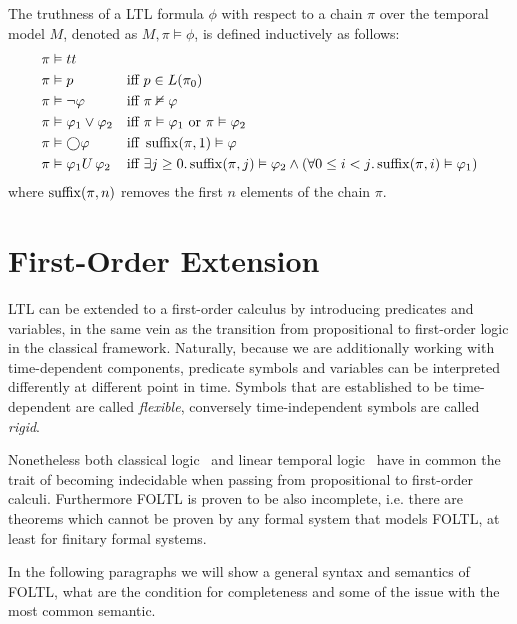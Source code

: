 \begin{definition}
  The truthness of a LTL formula $\phi$ with respect to a chain $\pi$ over the temporal model $M$, denoted as
  $M, \pi \vDash \phi$, is defined inductively as follows:
  \begin{align*}
    \pi &\vDash tt && \\
    \pi &\vDash p &&\text{iff } p \in L(\pi_0) \\
    \pi &\vDash \neg\varphi &&\text{iff } \pi \nvDash \varphi \\
    \pi &\vDash \varphi_1 \lor \varphi_2 &&\text{iff } \pi \vDash \varphi_1 \text{ or } \pi \vDash \varphi_2 \\
    \pi &\vDash \bigcirc{\varphi} &&\text{iff } \operatorname{suffix}(\pi, 1) \vDash \varphi \\
    \pi &\vDash {\varphi_1}U\,{\varphi_2} &&\text{iff } \exists {j \geq 0} \ldotp {\operatorname{suffix}(\pi, j) \vDash \varphi_2 \land
      (\forall {0 \leq i < j} \ldotp {\operatorname{suffix}(\pi, i) \vDash \varphi_1})}
  \end{align*}
  where $\operatorname{suffix}(\pi, n)$ removes the first $n$ elements of the chain $\pi$.
\end{definition}

\section{First-Order Extension}

LTL can be extended to a first-order calculus by introducing predicates and variables, in the same vein as the
transition from propositional to first-order logic in the classical framework. Naturally, because we are additionally
working with time-dependent components, predicate symbols and variables can be interpreted differently at different
point in time. Symbols that are established to be time-dependent are called \emph{flexible}, conversely time-independent
symbols are called \emph{rigid}.

Nonetheless both classical logic~\cite{turing_computable_1937} and linear temporal logic~\cite{merz_decidability_1992}
have in common the trait of becoming indecidable when passing from propositional to first-order calculi.
Furthermore \ac{FOLTL} is proven to be also incomplete, i.e. there are theorems which cannot be proven by any formal
system that models \ac{FOLTL}, at least for finitary formal systems.

In the following paragraphs we will show a general syntax and semantics of \ac{FOLTL}, what are
the condition for completeness and some of the issue with the most common semantic.

